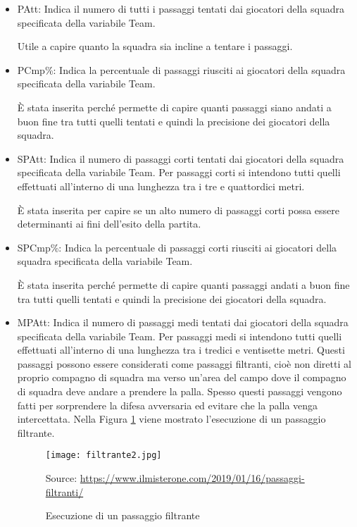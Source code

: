 \begin{itemize}
	
	
	\item \textsf{PAtt}: Indica il numero di tutti i passaggi tentati dai giocatori della squadra specificata della variabile \textsf{Team}. 
	
	Utile a capire quanto la squadra sia incline a tentare i passaggi.
	
	\item\textsf{PCmp\%}: Indica la percentuale di passaggi riusciti ai giocatori della squadra specificata della variabile \textsf{Team}. 
	
	È stata inserita perché permette di capire quanti passaggi siano andati a buon fine tra tutti quelli tentati e quindi la precisione dei giocatori della squadra.
	\item \textsf{SPAtt}: Indica il numero di passaggi corti tentati dai giocatori della squadra specificata della variabile \textsf{Team}. Per passaggi corti si intendono tutti quelli effettuati all'interno di una lunghezza tra i tre e quattordici metri.
	
	È stata inserita per capire se un alto numero di passaggi corti possa essere determinanti ai fini dell'esito della partita. 
	
	\item \textsf{SPCmp\%}: Indica la percentuale di passaggi corti riusciti ai giocatori della squadra specificata della variabile \textsf{Team}. 
	
	È stata inserita perché permette di capire quanti passaggi andati a buon fine tra tutti quelli tentati e quindi la precisione dei giocatori della squadra.
	
	\item \textsf{MPAtt}: Indica il numero di passaggi medi tentati dai giocatori della squadra specificata della variabile \textsf{Team}. Per passaggi medi si intendono tutti quelli effettuati all'interno di una lunghezza tra i tredici e ventisette metri. Questi passaggi possono essere considerati come passaggi filtranti, cioè non diretti al proprio compagno di squadra ma verso un’area del campo dove il compagno di squadra deve andare a prendere la palla. Spesso questi passaggi vengono fatti per sorprendere la difesa avversaria ed evitare che la palla venga intercettata. Nella Figura \ref{fig:filt} viene mostrato l'esecuzione di un passaggio filtrante.
	
	\begin{figure}[ht]
		\begin{center}
			\texttt{[image: filtrante2.jpg]}
			\caption{Esecuzione di un passaggio filtrante} \label{fig:filt}
			Source: \url{https://www.ilmisterone.com/2019/01/16/passaggi-filtranti/}
		\end{center}
	\end{figure}
	

\end{itemize}
